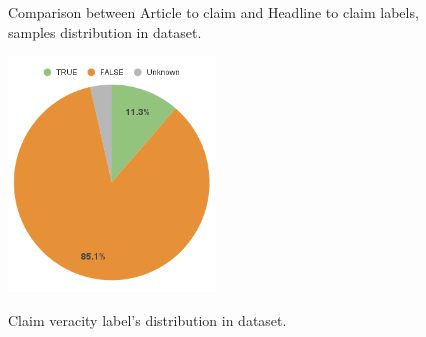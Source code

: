 \begin{figure}%
	\centering
	\qquad
	\caption{Comparison between Article to claim and Headline to claim labels, samples distribution in \cite{stance_persian} dataset.}%
	\label{fig:datacom}%
\end{figure}
\begin{figure}%
	\centering
	{\includegraphics[width=5.5cm]{statistics/stance/fake.png} }
	\caption{Claim veracity label's distribution in \cite{stance_persian} dataset.}%
	\label{fig:fake}%
\end{figure}
  
